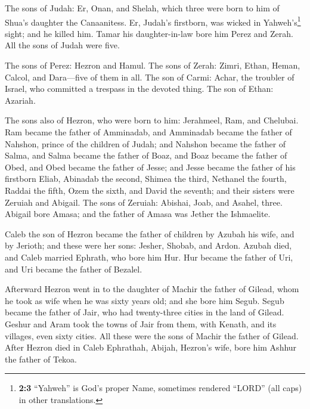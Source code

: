  The sons of Judah: Er, Onan, and Shelah, which three were
born to him of Shua's daughter the Canaanitess. Er, Judah's firstborn,
was wicked in Yahweh's\footnote{\textbf{2:3} ``Yahweh'' is God's proper
  Name, sometimes rendered ``LORD'' (all caps) in other translations.}
sight; and he killed him.  Tamar his daughter-in-law bore
him Perez and Zerah. All the sons of Judah were five.

 The sons of Perez: Hezron and Hamul.  The
sons of Zerah: Zimri, Ethan, Heman, Calcol, and Dara---five of them in
all.  The son of Carmi: Achar, the troubler of Israel, who
committed a trespass in the devoted thing.  The son of
Ethan: Azariah.

 The sons also of Hezron, who were born to him: Jerahmeel,
Ram, and Chelubai.  Ram became the father of Amminadab,
and Amminadab became the father of Nahshon, prince of the children of
Judah;  and Nahshon became the father of Salma, and Salma
became the father of Boaz,  and Boaz became the father of
Obed, and Obed became the father of Jesse;  and Jesse
became the father of his firstborn Eliab, Abinadab the second, Shimea
the third,  Nethanel the fourth, Raddai the fifth,
 Ozem the sixth, and David the seventh; 
and their sisters were Zeruiah and Abigail. The sons of Zeruiah:
Abishai, Joab, and Asahel, three.  Abigail bore Amasa;
and the father of Amasa was Jether the Ishmaelite.

 Caleb the son of Hezron became the father of children by
Azubah his wife, and by Jerioth; and these were her sons: Jesher,
Shobab, and Ardon.  Azubah died, and Caleb married
Ephrath, who bore him Hur.  Hur became the father of Uri,
and Uri became the father of Bezalel.

 Afterward Hezron went in to the daughter of Machir the
father of Gilead, whom he took as wife when he was sixty years old; and
she bore him Segub.  Segub became the father of Jair, who
had twenty-three cities in the land of Gilead.  Geshur
and Aram took the towns of Jair from them, with Kenath, and its
villages, even sixty cities. All these were the sons of Machir the
father of Gilead.  After Hezron died in Caleb Ephrathah,
Abijah, Hezron's wife, bore him Ashhur the father of Tekoa.

